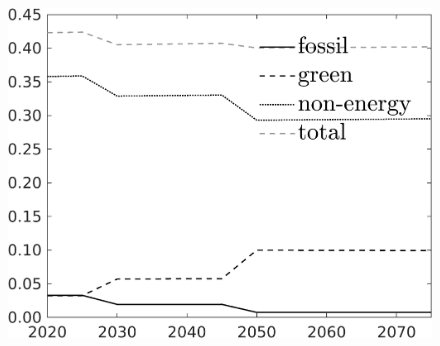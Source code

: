 \begin{figure}[h!!]
\begin{minipage}[]{0.32\textwidth}
	\end{minipage}
	\begin{minipage}[]{0.32\textwidth}
		\includegraphics[width=1\textwidth]{../../codding_model/own_basedOnFried/optimalPol_190722_tidiedUp/figures/all_July22/SingleJointTOT_regime3_OPT_T_NoTaus_Science_spillover0_noskill0_sep1_xgrowth0_extern0_etaa0.79_lgd1.png}
	\end{minipage}
	\begin{minipage}[]{0.32\textwidth}

\end{minipage}
\end{figure}

